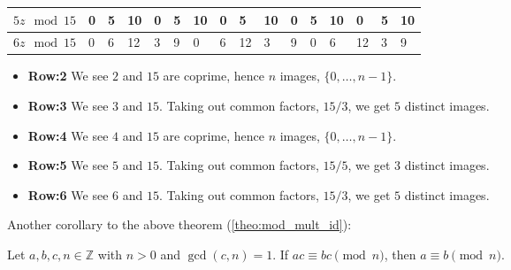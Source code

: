 \begin{table}[h!]
\begin{tabular}{|c|p{.2cm}|p{.6cm}|p{.6cm}|p{.6cm}|p{.6cm}|p{.6cm}|p{.6cm}|p{.6cm}|p{.6cm}|p{.6cm}|p{.6cm}|p{.6cm}|p{.6cm}|p{.6cm}|p{.6cm}|}
        $5z \mod 15$ 
        & 0 
        & \cellcolor{OliveGreen!25}5 
        & \cellcolor{OliveGreen!50}10 
        & 0 
        & \cellcolor{OliveGreen!25}5 
        & \cellcolor{OliveGreen!50}10 
        & 0 
        & \cellcolor{OliveGreen!25}5 
        & \cellcolor{OliveGreen!50}10 
        & 0 
        & \cellcolor{OliveGreen!25}5 
        & \cellcolor{OliveGreen!50}10 
        & 0 
        & \cellcolor{OliveGreen!25}5 
        & \cellcolor{OliveGreen!50}10 \\ \hline
        $6z \mod 15$ 
        & 0 
        & \cellcolor{OliveGreen!30}6 
        & \cellcolor{OliveGreen!60}12 
        & \cellcolor{OliveGreen!15}3 
        & \cellcolor{OliveGreen!45}9 
        & 0 
        & \cellcolor{OliveGreen!30}6 
        & \cellcolor{OliveGreen!60}12 
        & \cellcolor{OliveGreen!15}3 
        & \cellcolor{OliveGreen!45}9 
        & 0 
        & \cellcolor{OliveGreen!30}6 
        & \cellcolor{OliveGreen!60}12 
        & \cellcolor{OliveGreen!15}3 
        & \cellcolor{OliveGreen!45}9 \\ \hline
    \end{tabular}
\end{table}

\begin{itemize}
    \item \textbf{Row:2} We see $2$ and $15$ are coprime, hence $n$ images, $\{0,\dots,n-1\}$.
    \item \textbf{Row:3} We see $3$ and $15$. Taking out common factors, $15/3$, we get $5$ distinct images.
    \item \textbf{Row:4} We see $4$ and $15$ are coprime, hence $n$ images, $\{0,\dots,n-1\}$.
    \item \textbf{Row:5} We see $5$ and $15$. Taking out common factors, $15/5$, we get $3$ distinct images.
    \item \textbf{Row:6} We see $6$ and $15$. Taking out common factors, $15/3$, we get $5$ distinct images.
\end{itemize}

\newpage

Another corollary to the above theorem (\ref{theo:mod_mult_id}):
\begin{theo}

    Let \( a, b, c, n \in \mathbb{Z} \) with \( n > 0 \) and \( \gcd(c, n) = 1 \). If \( ac \equiv bc \pmod{n} \), then \( a \equiv b \pmod{n} \).
    
    \end{theo}
    
